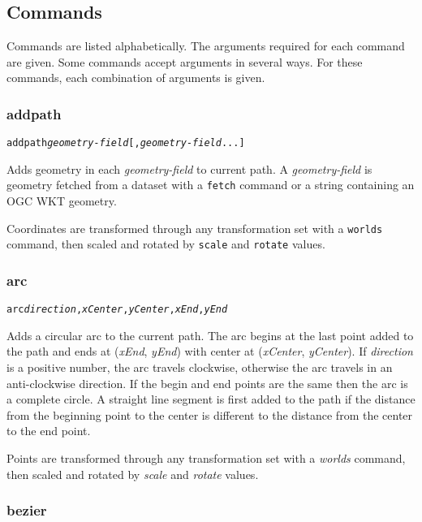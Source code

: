 \subsection{Commands}

Commands are listed alphabetically.  The arguments required for each command
are given.  Some commands accept arguments in several ways.  For these
commands, each combination of arguments is given.

\subsubsection{addpath}

\begin{alltt}
addpath \textit{geometry-field} [, \textit{geometry-field} ...]
\end{alltt}

Adds geometry in each \textit{geometry-field} to current path.
A \textit{geometry-field} is geometry fetched from a dataset
with a \texttt{fetch} command or a string containing an
OGC WKT geometry.

Coordinates are transformed through any
transformation set with a \texttt{worlds} command,
then scaled and rotated by \texttt{scale}
and \texttt{rotate} values.

\subsubsection{arc}

\begin{alltt}
arc \textit{direction}, \textit{xCenter}, \textit{yCenter}, \textit{xEnd}, \textit{yEnd}
\end{alltt}

Adds a circular arc to the current path.  The arc begins at
the last point added to the path and ends at (\textit{xEnd}, \textit{yEnd})
with center at (\textit{xCenter}, \textit{yCenter}).
If \textit{direction} is a positive number, the arc travels clockwise,
otherwise the arc travels in an anti-clockwise direction.
If the begin and end points are the same then the arc is a complete circle.
A straight line segment is first added to the path if
the distance from the beginning point to the center is different
to the distance from the center to the end point.

Points are transformed through any
transformation set with a \textit{worlds} command,
then scaled and rotated by \textit{scale}
and \textit{rotate} values.

\subsubsection{bezier}

